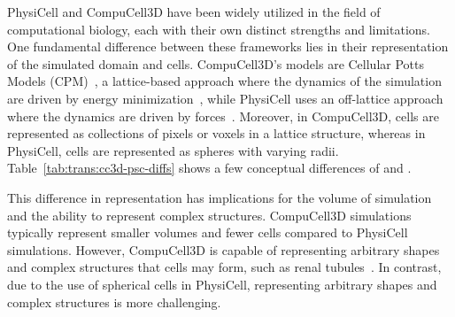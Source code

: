 
 PhysiCell and CompuCell3D have been widely utilized in the field of computational biology, each with their own distinct strengths and limitations. One fundamental difference between these frameworks lies in their representation of the simulated domain and cells. CompuCell3D's models are Cellular Potts Models (CPM)~\cite{graner1992simulation,glazier2007magnetization}, a lattice-based approach where the dynamics of the simulation are driven by energy minimization~\cite{graner1992simulation, swat_multi-scale_2012}, while PhysiCell uses an off-lattice approach where the dynamics are driven by forces~\cite{ghaffarizadeh_physicell_2018}. Moreover, in CompuCell3D, cells are represented as collections of pixels or voxels in a lattice structure, whereas in PhysiCell, cells are represented as spheres with varying radii. Table~\ref{tab:trans:cc3d-psc-diffs} shows a few conceptual differences of \ccds and \psc.
 

 This difference in representation has implications for the volume of simulation and the ability to represent complex structures. CompuCell3D simulations typically represent smaller volumes and fewer cells compared to PhysiCell simulations. However, CompuCell3D is capable of representing arbitrary shapes and complex structures that cells may form, such as renal tubules~\cite{belmonte_virtual-tissue_2016}. In contrast, due to the use of spherical cells in PhysiCell, representing arbitrary shapes and complex structures is more challenging.

